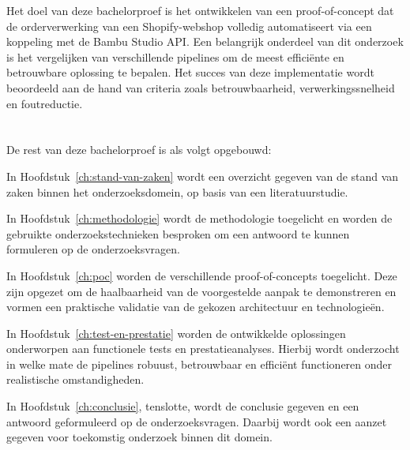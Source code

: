 Het doel van deze bachelorproef is het ontwikkelen van een proof-of-concept dat de orderverwerking van een Shopify-webshop volledig automatiseert via een koppeling met de Bambu Studio API. Een belangrijk onderdeel van dit onderzoek is het vergelijken van verschillende pipelines om de meest efficiënte en betrouwbare oplossing te bepalen. Het succes van deze implementatie wordt beoordeeld aan de hand van criteria zoals betrouwbaarheid, verwerkingssnelheid en foutreductie.


\section{}%
\label{sec:opzet-bachelorproef}


De rest van deze bachelorproef is als volgt opgebouwd:

In Hoofdstuk~\ref{ch:stand-van-zaken} wordt een overzicht gegeven van de stand van zaken binnen het onderzoeksdomein, op basis van een literatuurstudie.

In Hoofdstuk~\ref{ch:methodologie} wordt de methodologie toegelicht en worden de gebruikte onderzoekstechnieken besproken om een antwoord te kunnen formuleren op de onderzoeksvragen.


In Hoofdstuk~\ref{ch:poc} worden de verschillende proof-of-concepts toegelicht. Deze zijn opgezet om de haalbaarheid van de voorgestelde aanpak te demonstreren en vormen een praktische validatie van de gekozen architectuur en technologieën.

In Hoofdstuk~\ref{ch:test-en-prestatie} worden de ontwikkelde oplossingen onderworpen aan functionele tests en prestatieanalyses. Hierbij wordt onderzocht in welke mate de pipelines robuust, betrouwbaar en efficiënt functioneren onder realistische omstandigheden.

In Hoofdstuk~\ref{ch:conclusie}, tenslotte, wordt de conclusie gegeven en een antwoord geformuleerd op de onderzoeksvragen. Daarbij wordt ook een aanzet gegeven voor toekomstig onderzoek binnen dit domein.